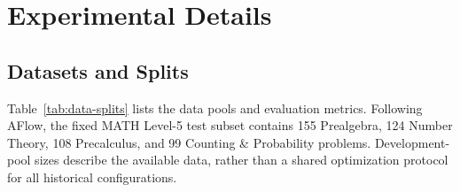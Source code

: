 

\section{Experimental Details}
\label{app:experimental-details}

\subsection{Datasets and Splits}
\label{app:data-splits}

Table~\ref{tab:data-splits} lists the data pools and evaluation metrics. Following AFlow, the fixed MATH Level-5 test subset contains 155 Prealgebra, 124 Number Theory, 108 Precalculus, and 99 Counting \& Probability problems. Development-pool sizes describe the available data, rather than a shared optimization protocol for all historical configurations.

\begin{table}[!htbp]
    \centering
    \setlength{\belowcaptionskip}{6pt}
    \caption{Datasets, local splits, and evaluation metrics. HumanEval uses five registered development-fold configurations over 33 problems and a fixed 131-problem test set. All reported scores are on a 0--100 scale.}
    \label{tab:data-splits}
    \footnotesize
    \setlength{\tabcolsep}{7pt}
\end{table}


